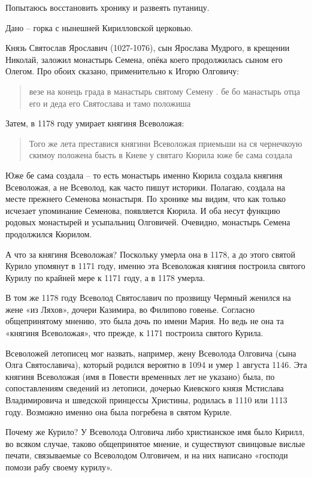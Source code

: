 Попытаюсь восстановить хронику и развеять путаницу.

Дано – горка с нынешней Кирилловской церковью.

Князь Святослав Ярославич (1027-1076), сын Ярослава Мудрого, в крещении Николай, заложил монастырь Семена, опёка коего продолжилась сыном его Олегом. Про обоих сказано, применительно к Игорю Олговичу:

\begin{quotation}
везе на конець града в манастырь святому 
Семену . бе бо манастырь отца его и деда его Святослава и тамо положиша
\end{quotation}

Затем, в 1178 году умирает княгиня Всеволожая: 

\begin{quotation}
Того же лета преставися княгини Всеволожая приемьши на ся чернечкоую скимоу положена бысть в Киеве у святаго Кюрила юже бе сама создала
\end{quotation}

Юже бе сама создала – то есть монастырь именно Кюрила создала княгиня Всеволожая, а не Всеволод, как часто пишут историки. Полагаю, создала на месте прежнего Семенова монастыря. По хронике мы видим, что как только исчезает упоминание Семенова, появляется Кюрила. И оба несут функцию родовых монастырей и усыпальниц Олговичей. Очевидно, монастырь Семена продолжился Кюрилом.

А что за княгиня Всеволожая? Поскольку умерла она в 1178, а до этого святой Курило упомянут в 1171 году, именно эта Всеволожая княгиня построила святого Курилу по крайней мере к 1171 году, а в 1178 умерла.

В том же 1178 году Всеволод Святославич по прозвищу Чермный женился на жене «из Ляхов», дочери Казимира, во Филипово говенье. Согласно общепринятому мнению, это была дочь по имени Мария. Но ведь не она та «княгиня Всеволожая», что прежде, к 1171 построила святого Курила.

Всеволожей летописец мог назвать, например, жену Всеволода Олговича (сына Олга Святославича), который родился вероятно в 1094 и умер 1 августа 1146. Эта княгиня Всеволожая (имя в Повести временных лет не указано) была, по сопоставлениям сведений из летописи, дочерью Киевского князя Мстислава Владимировича и шведской принцессы Христины, родилась в 1110 или 1113 году. Возможно именно она была погребена в святом Куриле.

Почему же Курило? У Всеволода Олговича либо христианское имя было Кирилл, во всяком случае, таково общепринятое мнение, и существуют свинцовые вислые печати, связываемые со Всеволодом Олговичем, и на них написано «господи помози рабу своему курилу».

